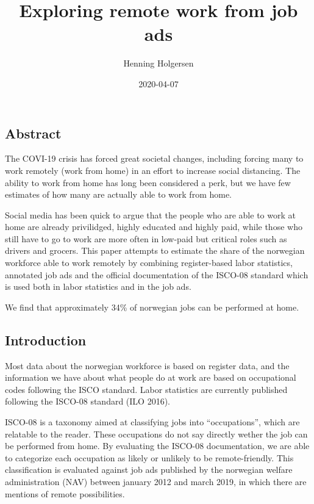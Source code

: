 \documentclass[]{article}
\title{Exploring remote work from job ads}
\author{Henning Holgersen}
\date{2020-04-07}
\begin{document}
\maketitle

\hypertarget{abstract}{%
\subsection{Abstract}\label{abstract}}

The COVI-19 crisis has forced great societal changes, including forcing
many to work remotely (work from home) in an effort to increase social
distancing. The ability to work from home has long been considered a
perk, but we have few estimates of how many are actually able to work
from home.

Social media has been quick to argue that the people who are able to
work at home are already privilidged, highly educated and highly paid,
while those who still have to go to work are more often in low-paid but
critical roles such as drivers and grocers. This paper attempts to
estimate the share of the norwegian workforce able to work remotely by
combining register-based labor statistics, annotated job ads and the
official documentation of the ISCO-08 standard which is used both in
labor statistics and in the job ads.

We find that approximately 34\% of norwegian jobs can be performed at
home.

\hypertarget{introduction}{%
\subsection{Introduction}\label{introduction}}

Most data about the norwegian workforce is based on register data, and
the information we have about what people do at work are based on
occupational codes following the ISCO standard. Labor statistics are
currently published following the ISCO-08 standard (ILO 2016).

ISCO-08 is a taxonomy aimed at classifying jobs into ``occupations'',
which are relatable to the reader. These occupations do not say directly
wether the job can be performed from home. By evaluating the ISCO-08
documentation, we are able to categorize each occupation as likely or
unlikely to be remote-friendly. This classification is evaluated against
job ads published by the norwegian welfare administration (NAV) between
january 2012 and march 2019, in which there are mentions of remote
possibilities.
\end{document}
